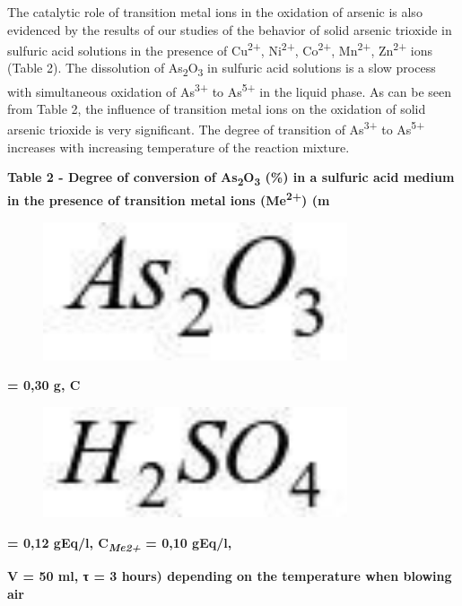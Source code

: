 The catalytic role of transition metal ions in the oxidation of arsenic
is also evidenced by the results of our studies of the behavior of solid
arsenic trioxide in sulfuric acid solutions in the presence of
Cu\textsuperscript{2+}, Ni\textsuperscript{2+}, Co\textsuperscript{2+},
Mn\textsuperscript{2+}, Zn\textsuperscript{2+} ions (Table 2). The
dissolution of As\textsubscript{2}O\textsubscript{3} in sulfuric acid
solutions is a slow process with simultaneous oxidation of
As\textsuperscript{3+} to As\textsuperscript{5+} in the liquid phase. As
can be seen from Table 2, the influence of transition metal ions on the
oxidation of solid arsenic trioxide is very significant. The degree of
transition of As\textsuperscript{3+} to As\textsuperscript{5+} increases
with increasing temperature of the reaction mixture.

{\bfseries Table 2 - Degree of conversion of
As\textsubscript{2}O\textsubscript{3} (\%) in a sulfuric acid medium in
the presence of transition metal ions (Me\textsuperscript{2+})
(m}\begin{figure}[H]
	\centering
	\includegraphics[width=0.8\textwidth]{assets/336}
	\caption*{}
\end{figure}{\bfseries = 0,30 g,
C}\begin{figure}[H]
	\centering
	\includegraphics[width=0.8\textwidth]{assets/331}
	\caption*{}
\end{figure}{\bfseries = 0,12 gEq/l,
C\emph{\textsubscript{Me2+}} = 0,10 gEq/l,}

{\bfseries V = 50 ml, τ = 3 hours) depending on the temperature when
blowing air}

